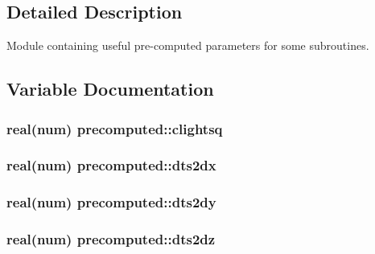 \subsection{Detailed Description}
Module containing useful pre-\/computed parameters for some subroutines. 

\subsection{Variable Documentation}
\subsubsection[{\texorpdfstring{clightsq}{clightsq}}]{\setlength{\rightskip}{0pt plus 5cm}real(num) precomputed\+::clightsq}\hypertarget{namespaceprecomputed_adbd674e54a2326703d464d475f0d1dc2}{}\label{namespaceprecomputed_adbd674e54a2326703d464d475f0d1dc2}
\subsubsection[{\texorpdfstring{dts2dx}{dts2dx}}]{\setlength{\rightskip}{0pt plus 5cm}real(num) precomputed\+::dts2dx}\hypertarget{namespaceprecomputed_a49f042055cd92a009da4a02b628430f7}{}\label{namespaceprecomputed_a49f042055cd92a009da4a02b628430f7}
\subsubsection[{\texorpdfstring{dts2dy}{dts2dy}}]{\setlength{\rightskip}{0pt plus 5cm}real(num) precomputed\+::dts2dy}\hypertarget{namespaceprecomputed_a173032b2394c4ed6da5fb1364fe17e6a}{}\label{namespaceprecomputed_a173032b2394c4ed6da5fb1364fe17e6a}
\subsubsection[{\texorpdfstring{dts2dz}{dts2dz}}]{\setlength{\rightskip}{0pt plus 5cm}real(num) precomputed\+::dts2dz}\hypertarget{namespaceprecomputed_af41461f1d38aa90f6b75318b3a6e8b70}{}\label{namespaceprecomputed_af41461f1d38aa90f6b75318b3a6e8b70}
